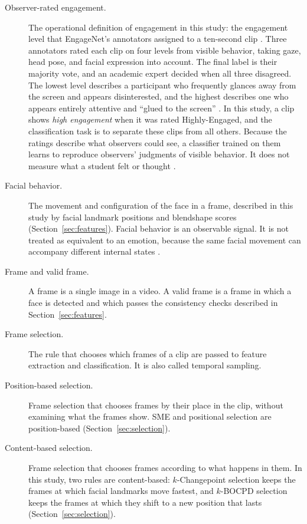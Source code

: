 \begin{description}
   \item[Observer-rated engagement.] The operational definition of engagement in this study: the engagement level that EngageNet's annotators assigned to a ten-second clip \cite{singh2023}. Three annotators rated each clip on four levels from visible behavior, taking gaze, head pose, and facial expression into account. The final label is their majority vote, and an academic expert decided when all three disagreed. The lowest level describes a participant who frequently glances away from the screen and appears disinterested, and the highest describes one who appears entirely attentive and ``glued to the screen'' \cite{singh2023}. In this study, a clip shows \emph{high engagement} when it was rated Highly-Engaged, and the classification task is to separate these clips from all others. Because the ratings describe what observers could see, a classifier trained on them learns to reproduce observers' judgments of visible behavior. It does not measure what a student felt or thought \cite{barrett2019}.

   \item[Facial behavior.] The movement and configuration of the face in a frame, described in this study by facial landmark positions and blendshape scores (Section~\ref{sec:features}). Facial behavior is an observable signal. It is not treated as equivalent to an emotion, because the same facial movement can accompany different internal states \cite{barrett2019}.

   \item[Frame and valid frame.] A frame is a single image in a video. A valid frame is a frame in which a face is detected and which passes the consistency checks described in Section~\ref{sec:features}.

   \item[Frame selection.] The rule that chooses which frames of a clip are passed to feature extraction and classification. It is also called temporal sampling.

   \item[Position-based selection.] Frame selection that chooses frames by their place in the clip, without examining what the frames show. SME and positional selection are position-based (Section~\ref{sec:selection}).

   \item[Content-based selection.] Frame selection that chooses frames according to what happens in them. In this study, two rules are content-based: $k$-Changepoint selection keeps the frames at which facial landmarks move fastest, and $k$-BOCPD selection keeps the frames at which they shift to a new position that lasts (Section~\ref{sec:selection}).


\end{description}
